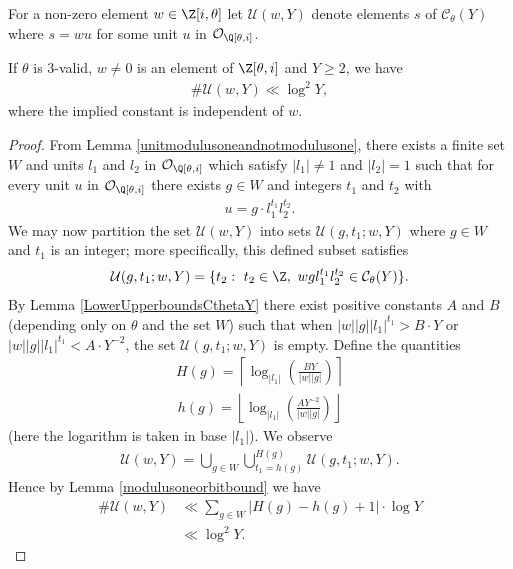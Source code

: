 \documentclass[12pt]{amsart}
\newcommand{\1}{\mathmybb{1}}
\begin{document}
For a non-zero element $w \in \Z[i,\theta]$ let $\mathcal{U}(w,Y)$ denote elements $s$ of $\mathcal{C}_{\theta}(Y)$ where $s = w u$ for some unit $u$ in $\mathcal{O}_{\Q[\theta,i]}$.
\begin{lem}
\label{twodimensionalunitlemma}
If $\theta$ is 3-valid, $w \neq 0$ is an element of $\Z[\theta,i]$ and $Y \geq 2$, we have
\begin{align*}
\#\mathcal{U}(w,Y) \ll \log^2 Y,
\end{align*}
where the implied constant is independent of $w$.
\end{lem}
\begin{proof}
From Lemma \ref{unitmodulusoneandnotmodulusone}, there exists a finite set $W$ and units $l_{1}$ and $l_{2}$ in $\mathcal{O}_{\Q[\theta,i]}$ which satisfy $|l_{1}| \neq 1$ and $|l_{2}| = 1$ such that for every unit $u$ in $\mathcal{O}_{\Q[\theta,i]}$ there exists $g \in W$ and integers $t_{1}$ and $t_{2}$ with
\begin{align*}
u = g \cdot l_{1}^{t_{1}}l_{2}^{t_{2}}.
\end{align*}
We may now partition the set $\mathcal{U}(w,Y)$ into sets $\mathcal{U}(g,t_{1};w,Y)$ where $g \in W$ and $t_{1}$ is an integer; more specifically, this defined subset satisfies 
\begin{align*}
\mathcal{U}(g,t_{1};w,Y) = \{t_{2}: \ t_{2}\in \Z, \ wgl_{1}^{t_{1}}l_{2}^{t_{2}}\in \mathcal{C}_{\theta}(Y)\}.
\end{align*}
By Lemma \ref{LowerUpperboundsCthetaY} there exist positive constants $A$ and $B$ (depending only on $\theta$ and the set $W$) such that when $|w||g||l_{1}|^{t_{1}} > B\cdot Y$ or $|w||g||l_{1}|^{t_{1}} < A\cdot Y^{-2}$, the set $\mathcal{U}(g,t_{1};w,Y)$ is empty. Define the quantities
\begin{align*}
H(g) = \left\lceil\log_{|l_{1}|}\left(\frac{B Y}{|w||g|}\right)\right\rceil
\end{align*}
\begin{align*}
h(g) = \left\lfloor\log_{|l_{1}|}\left( \frac{A Y^{-2}}{|w||g|}\right)\right\rfloor
\end{align*}
(here the logarithm is taken in base $|l_{1}|$). We observe
\begin{align*}
\mathcal{U}(w,Y) = \bigcup_{g\in W}\bigcup_{t_{1} = h(g)}^{H(g)}\mathcal{U}(g,t_{1};w,Y).
\end{align*}
Hence by Lemma \ref{modulusoneorbitbound} we have
\begin{align*}
\#\mathcal{U}(w,Y) &\ll \sum_{g\in W}\left|H(g) -h(g)+1\right|\cdot\log Y\\
&\ll \log^2 Y.
\end{align*}
\par \vspace{-\baselineskip} \qedhere
\end{proof}
\end{document}
